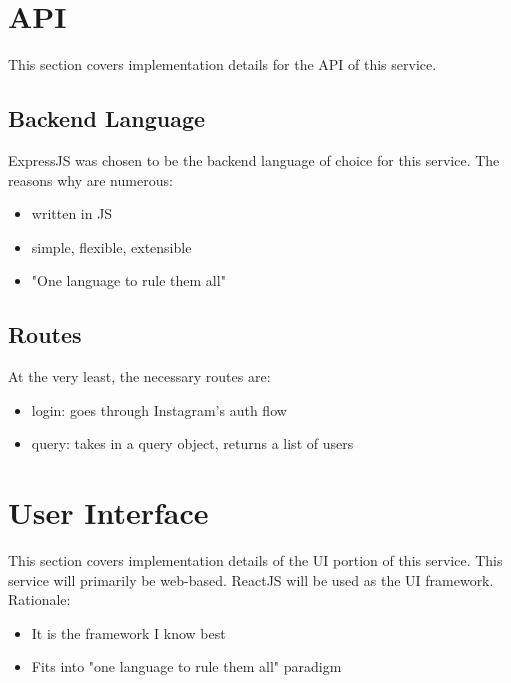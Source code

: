 \section{API}
This section covers implementation details for the API of this service.

\subsection{Backend Language}
ExpressJS was chosen to be the backend language of choice for this service.  The reasons why are numerous:
\begin{itemize}
    \item written in JS
    \item simple, flexible, extensible
    \item "One language to rule them all"
\end{itemize}

\subsection{Routes}
At the very least, the necessary routes are:
\begin{itemize}
    \item login: goes through Instagram's auth flow
    \item query: takes in a query object, returns a list of users
\end{itemize}


\section{User Interface}
This section covers implementation details of the UI portion of this service. This service will primarily be web-based. ReactJS will be used as the UI framework. Rationale:
\begin{itemize}
    \item It is the framework I know best
    \item Fits into "one language to rule them all" paradigm
\end{itemize}
